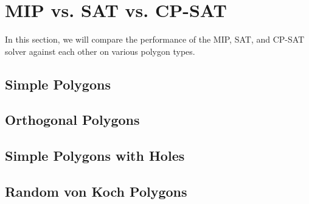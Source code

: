\section{MIP vs. SAT vs. CP-SAT}
In this section, we will compare the performance of the MIP, SAT, and CP-SAT solver against each other on various polygon types.

\subsection{Simple Polygons}

\subsection{Orthogonal Polygons}

\subsection{Simple Polygons with Holes}

\subsection{Random von Koch Polygons}
